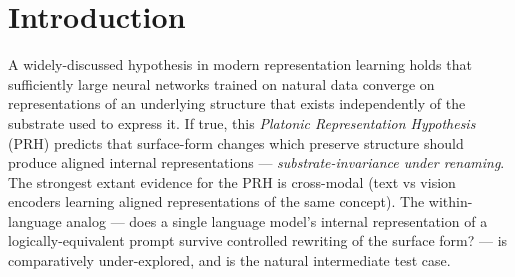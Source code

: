 \documentclass[11pt,letterpaper]{article}
\newcommand{\Mc}{M2-canonical}
\newcommand{\Ma}{M2-arity}
\begin{document}
\begin{abstract}
reclassified FAIL under the cleaner statistic; the OLMo 2 7B
flagship cell at L\,10 close-paren is causally inert under both tested
source anchors. Within-target source-anchor flip can produce opposite
verdicts at identical target and layer, but source anchor is not
directionally deterministic --- the verdict is the joint product of
source, target, and layer. We contribute four methodological devices:
the lucky-default detector, the \Mc{}~/~\Ma{} dissociation, the
same-target~/~different-source patching protocol, and the
within-vocabulary content-word control. The two-part result locates a
precise empirical edge of the Platonic Representation Hypothesis at
the within-language scale: cross-notation \emph{geometric}
substrate-invariance for the words the model was trained on, with
non-uniform and generally modest causal load-bearingness; no
substrate-independent category that extends to novel members.
\end{abstract}

\section{Introduction}
\label{sec:intro}

A widely-discussed hypothesis in modern representation learning
\citep{huh2024platonic} holds that sufficiently large neural networks
trained on natural data converge on representations of an underlying
structure that exists independently of the substrate used to express
it. If true, this \emph{Platonic Representation Hypothesis} (PRH)
predicts that surface-form changes which preserve structure should
produce aligned internal representations --- \emph{substrate-invariance
under renaming}. The strongest extant evidence for the PRH is
cross-modal (text vs vision encoders learning aligned representations
of the same concept). The within-language analog --- does a single
language model's internal representation of a logically-equivalent
prompt survive controlled rewriting of the surface form? --- is
comparatively under-explored, and is the natural intermediate test case.
\end{document}
